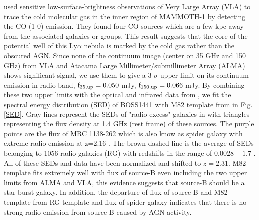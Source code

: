 \documentclass[../Results.tex]{subfiles}
\begin{document}
	\cite{emonts2019cold} used sensitive low-surface-brightness observations of Very Large Array (VLA) to trace the cold molecular gas in the inner region of MAMMOTH-1 by detecting the CO (1-0) emission. They found four CO sources which are a few kpc away from the associated galaxies or groups. This result suggests that the core of the potential well of this Ly$\alpha$ nebula is marked by the cold gas rather than the obscured AGN. Since none of the continuum image (center on 35 GHz and 150 GHz) from VLA and Atacama Large Millimeter/submillimeter Array (ALMA) shows significant signal, we use them to give a 3-$\sigma$ upper limit on its continuum emission in radio band, $\rm f_{35,up}=0.050$ mJy, $\rm f_{150,up}=0.066$ mJy. By combining these two upper limits with the optical and infrared data from \citet{arrigoni2018overdensity}, we fit the spectral energy distribution (SED) of BOSS1441 with M82 template from \cite{Silva_1998} in Fig.\ref{SED}. Gray lines represent the SEDs of "radio-excess" galaxies in \citet{harrison2014kiloparsec} with triangles representing the flux density at 1.4 GHz (rest frame) of these sources. The purple points are the flux of MRC 1138-262 which is also know as spider galaxy with extreme radio emission at z=2.16 \citep{Nesvadba_2006}. The brown dashed line is the average of SEDs belonging to 1056 radio galaxies (RG) with redshifts in the range of $0.0028-1.7$ \citep{Toba_2019}. All of these SEDs and data have been normalized and shifted to $z=2.31$. M82 template fits extremely well with flux of source-B even including the two upper limits from ALMA and VLA, this evidence suggests that source-B should be a star burst galaxy. In addition, the departure of flux of source-B and M82 template from RG template and flux of spider galaxy indicates that there is no strong radio emission from source-B caused by AGN activity.
	
\end{document}
